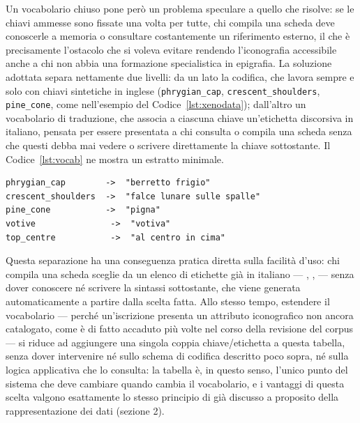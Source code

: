 \documentclass[11pt,a4paper]{article}
\begin{document}
Un vocabolario chiuso pone però un problema speculare a quello che
risolve: se le chiavi ammesse sono fissate una volta per tutte, chi
compila una scheda deve conoscerle a memoria o consultare costantemente
un riferimento esterno, il che è precisamente l'ostacolo che si voleva
evitare rendendo l'iconografia accessibile anche a chi non abbia una
formazione specialistica in epigrafia. La soluzione adottata separa
nettamente due livelli: da un lato la codifica, che lavora sempre e solo
con chiavi sintetiche in inglese (\texttt{phrygian\_cap},
\texttt{crescent\_shoulders}, \texttt{pine\_cone}, come nell'esempio del
Codice~\ref{lst:xenodata}); dall'altro un vocabolario di traduzione, che
associa a ciascuna chiave un'etichetta discorsiva in italiano, pensata
per essere presentata a chi consulta o compila una scheda senza che
questi debba mai vedere o scrivere direttamente la chiave sottostante.
Il Codice~\ref{lst:vocab} ne mostra un estratto minimale.

\begin{lstlisting}[caption={Estratto del vocabolario di traduzione
chiave $\to$ etichetta}, label={lst:vocab}]
phrygian_cap        ->  "berretto frigio"
crescent_shoulders  ->  "falce lunare sulle spalle"
pine_cone           ->  "pigna"
votive               ->  "votiva"
top_centre           ->  "al centro in cima"
\end{lstlisting}

Questa separazione ha una conseguenza pratica diretta sulla facilità
d'uso: chi compila una scheda sceglie da un elenco di etichette già in
italiano --- , ,
 --- senza dover conoscere né scrivere la sintassi
sottostante, che viene generata automaticamente a partire dalla scelta
fatta. Allo stesso tempo, estendere il vocabolario --- perché
un'iscrizione presenta un attributo iconografico non ancora catalogato,
come è di fatto accaduto più volte nel corso della revisione del corpus
--- si riduce ad aggiungere una singola coppia chiave/etichetta a questa
tabella, senza dover intervenire né sullo schema di codifica descritto
poco sopra, né sulla logica applicativa che lo consulta: la tabella è,
in questo senso, l'unico punto del sistema che deve cambiare quando
cambia il vocabolario, e i vantaggi di questa scelta valgono
esattamente lo stesso principio di  già
discusso a proposito della rappresentazione dei dati (sezione 2).
\end{document}

